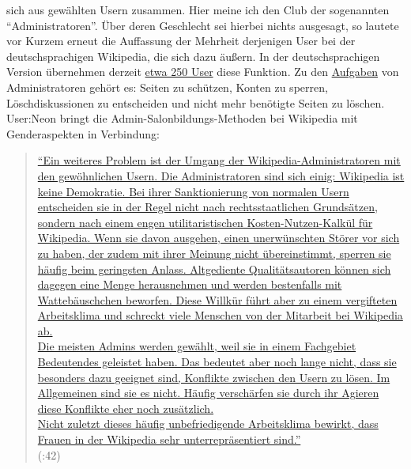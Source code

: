 \documentclass[fontsize=12pt]{scrartcl}
\begin{document}
sich aus gew\"ahlten Usern zusammen. \mbox{Hier} meine ich den Club der sogenannten "`Administratoren"'. \"Uber deren Geschlecht sei hierbei nichts ausgesagt, so lautete vor Kurzem erneut die Auffassung der Mehrheit derjenigen \mbox{User} bei der deutschspra\-chi\-gen Wi\-ki\-pe\-dia, die sich dazu \"au{\ss}ern. In der deutschspra\-chi\-gen Version \"ubernehmen derzeit \href{https://de.wikipedia.org/wiki/Wikipedia:Liste_der_Administratoren}{etwa 250 \mbox{User}} diese Funktion. Zu den \href{https://de.wikipedia.org/wiki/Wikipedia:Administratoren\#Administrator-Funktionen}{Aufgaben} von Administratoren\textsuperscript{\tiny *} geh\"ort es: Sei\-ten zu sch\"utzen, Konten zu sperren, L\"oschdis\-kus\-si\-onen zu entscheiden und nicht mehr ben\"otigte Sei\-ten zu l\"oschen. \mbox{User}:Neon bringt die Admin-Salonbildungs-Methoden bei Wi\-ki\-pe\-dia mit Genderaspekten in Verbindung:

\singlespacing
\begin{quote}
\href{https://commons.wikimedia.org/w/index.php?title=File:Allesueberwikipedia.pdf\&page=42}{"`Ein weiteres Pro\-blem ist der Umgang der Wi\-ki\-pe\-dia-Administratoren mit den gew\"ohnlichen Usern. Die Administratoren sind sich einig: \flq Wi\-ki\-pe\-dia ist keine Demokratie\frq. Bei ihrer Sanktionierung von normalen Usern entscheiden sie in der Regel nicht nach rechtsstaatlichen Grunds\"atzen, sondern nach einem engen utilitaristischen Kosten-Nutzen-Kal\-k\"ul f\"ur Wi\-ki\-pe\-dia. Wenn sie davon ausgehen, einen unerw\"unschten St\"orer vor sich zu haben, der zudem mit ihrer Meinung nicht \"ubereinstimmt, sperren sie h\"aufig beim geringsten Anlass. Altgediente \flq Qualit\"atsauto\-ren\frq \,\,k\"on\-nen sich dagegen eine Menge he\-rausnehmen und werden bestenfalls mit Watteb\"ausch\-chen beworfen. Diese Willk\"ur f\"uhrt aber zu einem ver\-gif\-te\-ten Arbeitsklima und schreckt viele Menschen von der Mitarbeit bei Wi\-ki\-pe\-dia ab.\\ Die meisten Admins werden gew\"ahlt, weil sie in einem Fachgebiet Bedeutendes geleistet haben. Das bedeutet aber noch lange nicht, dass sie besonders dazu ge\-eig\-net sind, Konflikte zwischen den Usern zu l\"osen. Im Allgemeinen sind sie es nicht. H\"aufig versch\"arfen sie durch ihr Agieren diese Konflikte eher noch zus\"atzlich.\\ Nicht zu\-letzt dieses h\"aufig unbefriedigende Arbeitsklima bewirkt, dass Frauen in der Wi\-ki\-pe\-dia sehr unterrepr\"asentiert sind."'}\\ (\cite{BenutzerNeon022011}:42)
\end{quote}
\onehalfspacing
\end{document}
